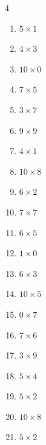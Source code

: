 \begin{multicols}{4}
\begin{enumerate}
  \item $5\times 1$
        \phantom{$=5$}

  \item $4\times 3$
        \phantom{$=12$}

  \item $10\times 0$
        \phantom{$=0$}

  \item $7\times 5$
        \phantom{$=35$}

  \item $3\times 7$
        \phantom{$=21$}

  \item $9\times 9$
        \phantom{$=81$}

  \item $4\times 1$
        \phantom{$=4$}

  \item $10\times 8$
        \phantom{$=80$}

  \item $6\times 2$
        \phantom{$=12$}

  \item $7\times 7$
        \phantom{$=49$}

  \item $6\times 5$
        \phantom{$=30$}

  \item $1\times 0$
        \phantom{$=0$}

  \item $6\times 3$
        \phantom{$=18$}

  \item $10\times 5$
        \phantom{$=50$}

\columnbreak %

  \item $0\times 7$
        \phantom{$=0$}

  \item $7\times 6$
        \phantom{$=42$}

  \item $3\times 9$
        \phantom{$=27$}

  \item $5\times 4$
        \phantom{$=20$}

  \item $5\times 2$
        \phantom{$=10$}

  \item $10\times 8$
        \phantom{$=80$}

  \item $5\times 2$
        \phantom{$=10$}


\end{enumerate}
\end{multicols}
